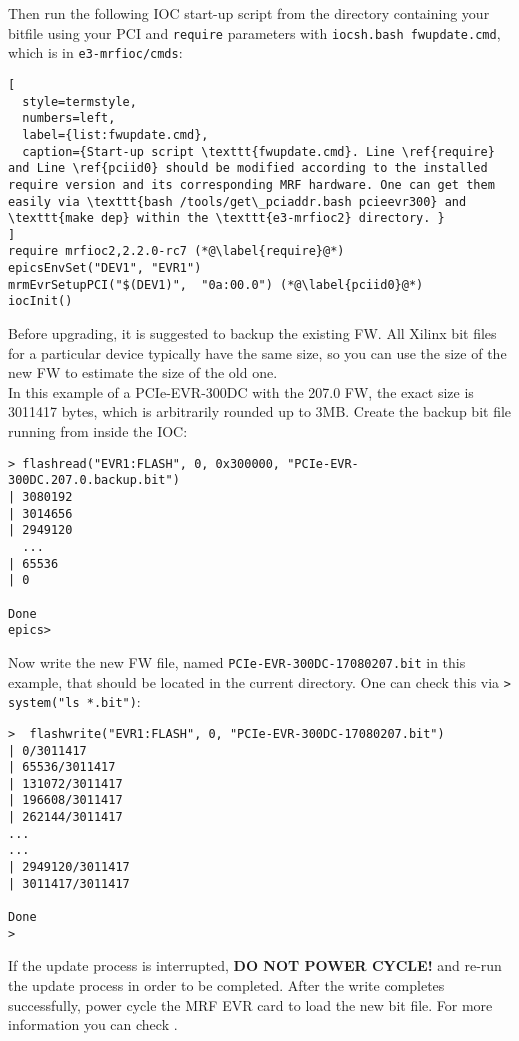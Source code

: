 \documentclass[11pt
  , a4paper
  , article
  , oneside
  , showtrims
]{memoir}
\begin{document}
Then run the following IOC start-up script from the directory containing your bitfile using your PCI and \texttt{require} parameters with \texttt{iocsh.bash fwupdate.cmd}, which is in \texttt{e3-mrfioc/cmds}:
\begin{lstlisting}[
  style=termstyle,
  numbers=left,
  label={list:fwupdate.cmd},
  caption={Start-up script \texttt{fwupdate.cmd}. Line \ref{require} and Line \ref{pciid0} should be modified according to the installed require version and its corresponding MRF hardware. One can get them easily via \texttt{bash /tools/get\_pciaddr.bash pcieevr300} and \texttt{make dep} within the \texttt{e3-mrfioc2} directory. }
]
require mrfioc2,2.2.0-rc7 (*@\label{require}@*)
epicsEnvSet("DEV1", "EVR1")
mrmEvrSetupPCI("$(DEV1)",  "0a:00.0") (*@\label{pciid0}@*)
iocInit()
\end{lstlisting}

Before upgrading, it is suggested to backup the existing FW. All Xilinx bit files for a particular device typically have the same size, so you can use the size of the new FW to estimate the size of the old one.\\

In this example of a PCIe-EVR-300DC with the 207.0 FW, the exact size is 3011417 bytes, which is arbitrarily rounded up to 3MB. Create the backup bit file running from inside the IOC:
\begin{lstlisting}[style=termstyle]
> flashread("EVR1:FLASH", 0, 0x300000, "PCIe-EVR-300DC.207.0.backup.bit")
| 3080192
| 3014656
| 2949120
  ...
| 65536
| 0

Done
epics>
\end{lstlisting}

Now write the new FW file, named \texttt{PCIe-EVR-300DC-17080207.bit} in this example, that should be located in the current directory. One can check this via \texttt{> system("ls *.bit")}:
\begin{lstlisting}[style=termstyle]
>  flashwrite("EVR1:FLASH", 0, "PCIe-EVR-300DC-17080207.bit")
| 0/3011417
| 65536/3011417
| 131072/3011417
| 196608/3011417
| 262144/3011417
...
...
| 2949120/3011417
| 3011417/3011417

Done
>
\end{lstlisting}

If the update process is interrupted, \textbf{DO NOT POWER CYCLE!} and re-run the update process in order to be completed. After the write completes successfully, power cycle the MRF EVR card to load the new bit file. For more information you can check \citep[section Firmware Update, PCIe-EVR-300DC, mTCA-EVR-300]{EVRUSAGEGUIDE}.\\
\end{document}
